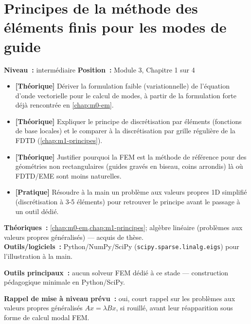
\chapter{Principes de la méthode des éléments finis pour les modes de guide}
\label{chap:m3-principes}

\noindent\textbf{Niveau~:} intermédiaire \hfill \textbf{Position~:} Module 3, Chapitre 1 sur 4

\begin{objectifs}
\begin{itemize}[leftmargin=1.4em]
  \item \textbf{[Théorique]} Dériver la formulation faible (variationnelle) de l'équation d'onde vectorielle pour le calcul de modes, à partir de la formulation forte déjà rencontrée en \cref{chap:m0-em}.
  \item \textbf{[Théorique]} Expliquer le principe de discrétisation par éléments (fonctions de base locales) et le comparer à la discrétisation par grille régulière de la FDTD (\cref{chap:m1-principes}).
  \item \textbf{[Théorique]} Justifier pourquoi la FEM est la méthode de référence pour des géométries non rectangulaires (guides gravés en biseau, coins arrondis) là où FDTD/EME sont moins naturelles.
  \item \textbf{[Pratique]} Résoudre \og à la main\fg{} un problème aux valeurs propres 1D simplifié (discrétisation à 3-5 éléments) pour retrouver le principe avant le passage à un outil dédié.
\end{itemize}
\end{objectifs}

\begin{prerequis}
\textbf{Théoriques~:} \cref{chap:m0-em,chap:m1-principes}; algèbre linéaire (problèmes aux valeurs propres généralisés) — acquis de thèse.\\
\textbf{Outils/logiciels~:} Python/NumPy/SciPy (\texttt{scipy.sparse.linalg.eigs}) pour l'illustration \og à la main\fg{}.
\end{prerequis}

\noindent\textbf{Outils principaux~:} aucun solveur FEM dédié à ce stade — construction pédagogique minimale en Python/SciPy.

\noindent\textbf{Rappel de mise à niveau prévu~:} oui, court rappel sur les problèmes aux valeurs propres généralisés $A x = \lambda B x$, si rouillé, avant leur réapparition sous forme de calcul modal FEM.


